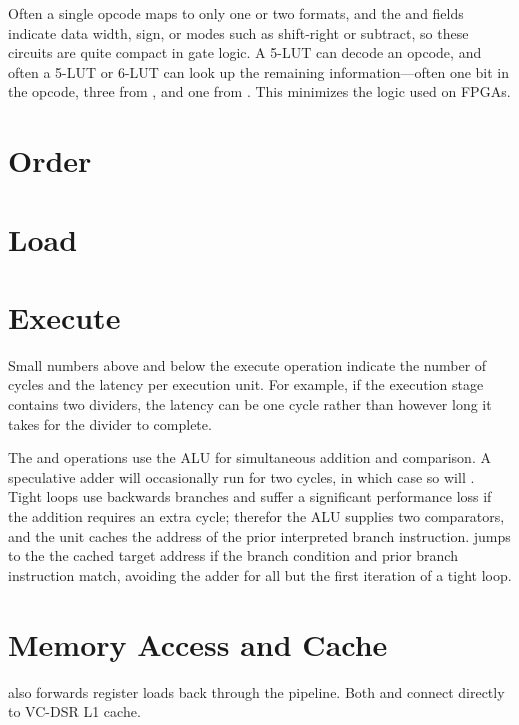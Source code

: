 Often a single opcode maps to only one or two formats, and the  and  fields indicate data width, sign, or modes such as shift-right or subtract, so these circuits are quite compact in gate logic.  A 5-LUT can decode an opcode, and often a 5-LUT or 6-LUT can look up the remaining information—often one bit in the opcode, three from , and one from .  This minimizes the logic used on FPGAs.

\section{Order}

\section{Load}

\section{Execute}

Small numbers above and below the execute operation indicate the number of cycles and the latency per execution unit.  For example, if the execution stage contains two dividers, the latency can be one cycle rather than however long it takes for the divider to complete.

The  and  operations use the ALU for simultaneous addition and comparison.  A speculative adder will occasionally run for two cycles, in which case so will .  Tight loops use backwards branches and suffer a significant performance loss if the addition requires an extra cycle; therefor the ALU supplies two comparators, and the  unit caches the address of the prior interpreted branch instruction.   jumps to the the cached target address if the branch condition and prior branch instruction match, avoiding the adder for all but the first iteration of a tight loop.

\section{Memory Access and Cache}

 also forwards register loads back through the pipeline.  Both  and  connect directly to VC-DSR L1 cache.